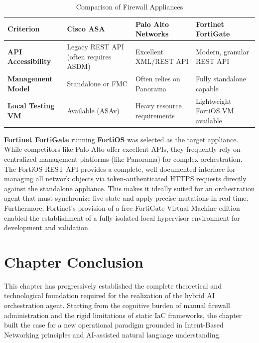 \begin{table}[htbp]
    \small
    \centering
    \renewcommand{\arraystretch}{1.4}
    \begin{tabular}{|p{3.0cm}|p{3.5cm}|p{3.5cm}|p{3.8cm}|}
        \hline
        \textbf{Criterion} & \textbf{Cisco ASA} & \textbf{Palo Alto Networks} & \textbf{Fortinet FortiGate} \\
        \hline
        \textbf{API Accessibility} & Legacy REST API (often requires ASDM) & Excellent XML/REST API & Modern, granular REST API \\
        \hline
        \textbf{Management Model} & Standalone or FMC & Often relies on Panorama & Fully standalone capable \\
        \hline
        \textbf{Local Testing VM} & Available (ASAv) & Heavy resource requirements & Lightweight FortiOS VM available \\
        \hline
    \end{tabular}
    \caption{Comparison of Firewall Appliances}
    \label{tab:firewall_appliances}
\end{table}

\textbf{Fortinet FortiGate} running \textbf{FortiOS} was selected as the target appliance. While competitors like Palo Alto offer excellent APIs, they frequently rely on centralized management platforms (like Panorama) for complex orchestration. The FortiOS REST API provides a complete, well-documented interface for managing all network objects via token-authenticated HTTPS requests directly against the standalone appliance. This makes it ideally suited for an orchestration agent that must synchronize live state and apply precise mutations in real time. Furthermore, Fortinet's provision of a free FortiGate Virtual Machine edition enabled the establishment of a fully isolated local hypervisor environment for development and validation.

\section{Chapter Conclusion}
This chapter has progressively established the complete theoretical and technological foundation required for the realization of the hybrid AI orchestration agent. Starting from the cognitive burden of manual firewall administration and the rigid limitations of static IaC frameworks, the chapter built the case for a new operational paradigm grounded in Intent-Based Networking principles and AI-assisted natural language understanding.


